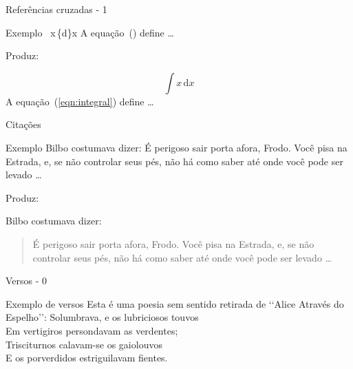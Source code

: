\begin{frame}{Referências cruzadas - 1}
	\begin{Codigo}{Exemplo}
		\n
		\n
		\string\int\ x\string\,\string\mathrm\{d\}x\n
		\n
		A equação~() define \string\dots
	\end{Codigo}

    \pause
	Produz:
	
	\begin{Resultado}{}
		\begin{equation}
			\label{eqn:integral}
			\int x\,\mathrm{d}x
		\end{equation}
		A equação~(\ref{eqn:integral}) define \dots
	\end{Resultado}
\end{frame}

\begin{frame}{Citações}
	\begin{Codigo}{Exemplo}
		Bilbo costumava dizer:\n
		\n
			É perigoso sair porta afora, Frodo. Você pisa na Estrada, e, se não controlar seus pés, não há como saber até onde você pode ser levado \ldots\n
	\end{Codigo}

    \pause
	Produz:

	\begin{Resultado}{}
		Bilbo costumava dizer:
		\begin{quote}\normalfont
			É perigoso sair porta afora, Frodo. Você pisa na Estrada, e, se não controlar seus pés, não há como saber até onde você pode ser levado \ldots
		\end{quote}
	\end{Resultado}
\end{frame}

\begin{frame}{Versos - 0}
	\begin{Codigo}{Exemplo de versos}
		Esta é uma poesia sem sentido retirada de
		`{}`Alice Através do Espelho'{}':
		\nn
		\n
			\n
		\n
		\n
			Solumbrava, e os lubriciosos touvos \string\\ \n
			Em vertigiros persondavam as verdentes; \string\\ \n
			Trisciturnos calavam-se os gaiolouvos \string\\ \n
			E os porverdidos estriguilavam fientes.\n
	\end{Codigo}
\end{frame}

